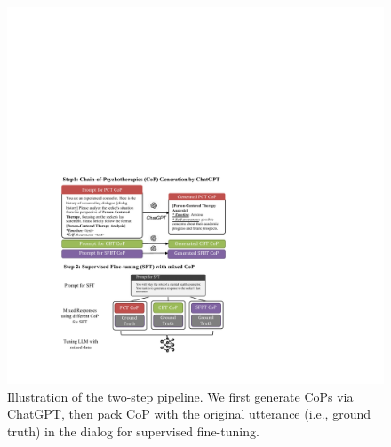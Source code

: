 \begin{figure}[th]
	\centering
	\includegraphics[width=\linewidth]{figures/prompt_resp_v2.pdf}
	\caption{Illustration of the two-step pipeline. We first generate CoPs via ChatGPT, then pack CoP with the original utterance (i.e., ground truth) in the dialog for supervised fine-tuning.}
	\label{fig:prompt_resp}
\end{figure}



